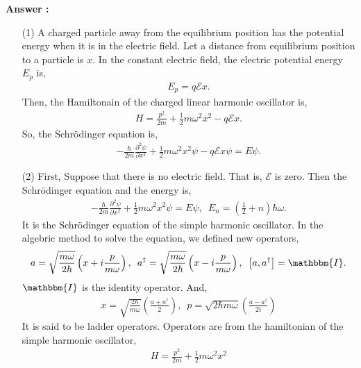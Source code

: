 \documentclass[floatfix,nofootinbib,superscriptaddress,fleqn]{revtex4-2}
\begin{document}
\noindent \textbf{Answer : }
\begin{itemize}
  \item[(1)] A charged particle away from the equilibrium position 
  has the potential energy when it is in the electric field. 
  Let a distance from equilibrium position to a particle is $x$.
  In the constant electric field, the electric potential energy $E_p$ is,
  \begin{align}
    E_p = q\mathcal{E}x.
  \end{align} 
  Then, the Hamiltonain of the charged linear
  harmonic oscillator is,
  \begin{align}\label{eq:1-1}
    H = \frac{p^2}{2m}+\frac{1}{2}m\omega^2x^2-q\mathcal{E}x.
  \end{align}
  So, the Schr\"odinger equation is,
  \begin{align}\label{eq:1-2}
    -\frac{\hbar}{2m}\frac{\partial^2\psi}{\partial x^2}
    +\frac{1}{2}m\omega^2x^2\psi
    -q\mathcal{E}x\psi = E\psi.
  \end{align}
  \item[(2)] First, Suppose that there is no electric field.
  That is, $\mathcal{E}$ is zero. Then the Schr\"odinger equation and 
  the energy is,
  \begin{align}
    -\frac{\hbar}{2m}\frac{\partial^2\psi}{\partial x^2}
    +\frac{1}{2}m\omega^2x^2\psi = E\psi,\,\,\, 
    E_n = \left(\frac{1}{2}+n\right)\hbar\omega.
  \end{align}
  It is the Schr\"odinger equation of the simple harmonic oscillator. 
  In the algebric method to solve the equation, 
  we defined new operators,
  \begin{align}
    \begin{split}
      a = \sqrt{\frac{m\omega}{2\hbar}}\left(x+i\frac{p}{m\omega}\right),\,\,\,
      a^\dagger = \sqrt{\frac{m\omega}{2\hbar}}\left(x-i\frac{p}{m\omega}\right),\,\,\,
      \left[a,a^\dagger\right] = \mathbbm{I}.
    \end{split}
  \end{align}
  $\mathbbm{I}$ is the identity operator. And,
  \begin{align}
    x = \sqrt{\frac{2\hbar}{m\omega}}\left(\frac{a+a^\dagger}{2}\right),\,\,\,
    p = \sqrt{2\hbar m\omega}\left(\frac{a-a^\dagger}{2i}\right)
  \end{align}
  It is said to be ladder operators. Operators are from the hamiltonian of 
  the simple harmonic oscillator,
  \begin{align}\label{eq:1-3}
    H = \frac{p^2}{2m}+\frac{1}{2}m\omega^2x^2 

\end{align}
\end{itemize}
\end{document}
